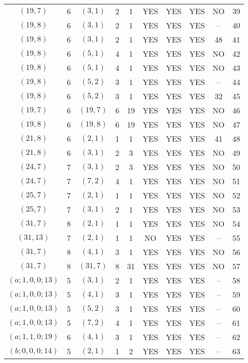 \begin{longtable}{|c|c|c|c|c|c|c|c|c|c|}
$(19, 7)$ & 6 & $(3, 1)$ & 2 & 1 & YES & YES & YES & NO & 39\\
$(19, 8)$ & 6 & $(3, 1)$ & 2 & 1 & YES & YES & YES & -- & 40\\
$(19, 8)$ & 6 & $(3, 1)$ & 2 & 1 & YES & YES & YES & 48 & 41\\
$(19, 8)$ & 6 & $(5, 1)$ & 4 & 1 & YES & YES & YES & NO & 42\\
$(19, 8)$ & 6 & $(5, 1)$ & 4 & 1 & YES & YES & YES & NO & 43\\
$(19, 8)$ & 6 & $(5, 2)$ & 3 & 1 & YES & YES & YES & -- & 44\\
$(19, 8)$ & 6 & $(5, 2)$ & 3 & 1 & YES & YES & YES & 32 & 45\\
$(19, 7)$ & 6 & $(19, 7)$ & 6 & 19 & YES & YES & YES & NO & 46\\
$(19, 8)$ & 6 & $(19, 8)$ & 6 & 19 & YES & YES & YES & NO & 47\\
$(21, 8)$ & 6 & $(2, 1)$ & 1 & 1 & YES & YES & YES & 41 & 48\\
$(21, 8)$ & 6 & $(3, 1)$ & 2 & 3 & YES & YES & YES & NO & 49\\
$(24, 7)$ & 7 & $(3, 1)$ & 2 & 3 & YES & YES & YES & NO & 50\\
$(24, 7)$ & 7 & $(7, 2)$ & 4 & 1 & YES & YES & YES & NO & 51\\
$(25, 7)$ & 7 & $(2, 1)$ & 1 & 1 & YES & YES & YES & NO & 52\\
$(25, 7)$ & 7 & $(3, 1)$ & 2 & 1 & YES & YES & YES & NO & 53\\
$(31, 7)$ & 8 & $(2, 1)$ & 1 & 1 & YES & YES & YES & NO & 54\\
$(31, 13)$ & 7 & $(2, 1)$ & 1 & 1 & NO & YES & YES & -- & 55\\
$(31, 7)$ & 8 & $(4, 1)$ & 3 & 1 & YES & YES & YES & NO & 56\\
$(31, 7)$ & 8 & $(31, 7)$ & 8 & 31 & YES & YES & YES & NO & 57\\
$(a; 1, 0, 0; 13)$ & 5 & $(3, 1)$ & 2 & 1 & YES & YES & YES & -- & 58\\
$(a; 1, 0, 0; 13)$ & 5 & $(4, 1)$ & 3 & 1 & YES & YES & YES & -- & 59\\
$(a; 1, 0, 0; 13)$ & 5 & $(5, 2)$ & 3 & 1 & YES & YES & YES & -- & 60\\
$(a; 1, 0, 0; 13)$ & 5 & $(7, 2)$ & 4 & 1 & YES & YES & YES & -- & 61\\
$(a; 1, 1, 0; 19)$ & 6 & $(4, 1)$ & 3 & 1 & YES & YES & YES & -- & 62\\
$(b; 0, 0, 0; 14)$ & 5 & $(2, 1)$ & 1 & 2 & YES & YES & YES & -- & 63\\

\end{longtable}
